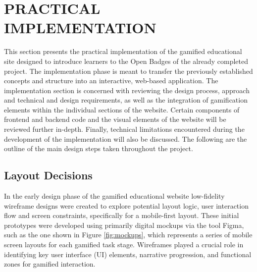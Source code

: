 \section{PRACTICAL IMPLEMENTATION}

This section presents the practical implementation of the gamified educational site designed to introduce learners to the Open Badges of the already completed project. 
The implementation phase is meant to transfer the previously established concepts and structure into an interactive, web-based application. 
The implementation section is concerned with reviewing the design process, approach and technical and design requirements, as well as the integration of gamification elements within the individual sections of the website. 
Certain components of frontend and backend code and the visual elements of the website will be reviewed further in-depth. 
Finally, technical limitations encountered during the development of the implementation will also be discussed. 
The following are the outline of the main design steps taken throughout the project.

\subsection{Layout Decisions}
In the early design phase of the gamified educational website low-fidelity wireframe designs were created to explore potential layout logic, user interaction flow and screen constraints, specifically for a mobile-first layout. 
These initial prototypes were developed using primarily digital mockups via the tool Figma, such as the one shown in Figure \ref {fig:mockups}, which represents a series of mobile screen layouts for each gamified task stage. 
Wireframes played a crucial role in identifying key user interface (UI) elements, narrative progression, and functional zones for gamified interaction.

